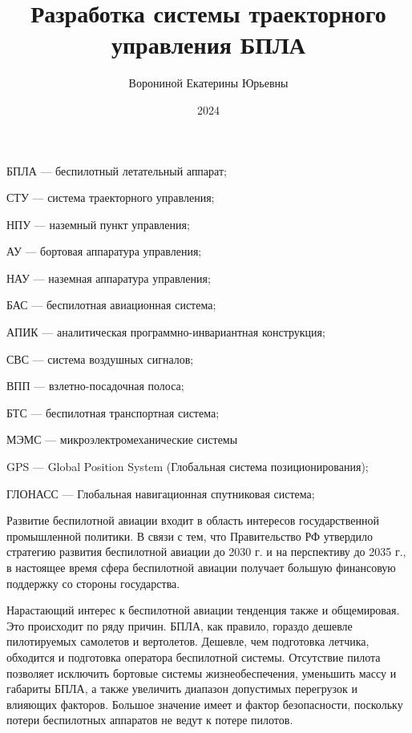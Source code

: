 \documentclass[pract, och, master]{SCWorks}
\begin{document}
\title{Разработка системы траекторного управления БПЛА}
\author{Ворониной Екатерины Юрьевны}
\date{2024}

\maketitle

\tableofcontents

\abbreviations
\begin{description}
	\item БПЛА --- беспилотный летательный аппарат;
	\item СТУ --- система траекторного управления;
	\item НПУ --- наземный пункт управления;
	\item АУ --- бортовая аппаратура управления;
	\item НАУ --- наземная аппаратура управления;
	\item БАС --- беспилотная авиационная система;
	\item АПИК --- аналитическая программно-инвариантная конструкция;
	\item СВС --- система воздушных сигналов;
	\item ВПП --- взлетно-посадочная полоса;
	\item БТС --- беспилотная транспортная система;
	\item МЭМС --- микроэлектромеханические системы
	\item GPS --- Global Position System (Глобальная система позиционирования);
	\item ГЛОНАСС --- Глобальная навигационная спутниковая система;
\end{description}

\intro
Развитие беспилотной авиации входит в область интересов государственной промышленной политики. 
В связи с тем, что  Правительство РФ утвердило стратегию развития беспилотной авиации до 2030 г. \cite{goverment} 
и на перспективу до 2035 г., в настоящее время сфера беспилотной авиации получает большую финансовую поддержку со стороны государства.

Нарастающий интерес к беспилотной авиации тенденция также и общемировая. Это происходит по ряду 
причин. БПЛА, как правило, гораздо дешевле пилотируемых самолетов и вертолетов. Дешевле, чем 
подготовка летчика, обходится и подготовка оператора беспилотной системы. Отсутствие пилота 
позволяет исключить бортовые системы жизнеобеспечения, уменьшить массу и габариты БПЛА, 
а также увеличить диапазон допустимых перегрузок и влияющих факторов. Большое значение имеет 
и фактор безопасности, поскольку потери беспилотных аппаратов не ведут к потере пилотов.
\end{document}
